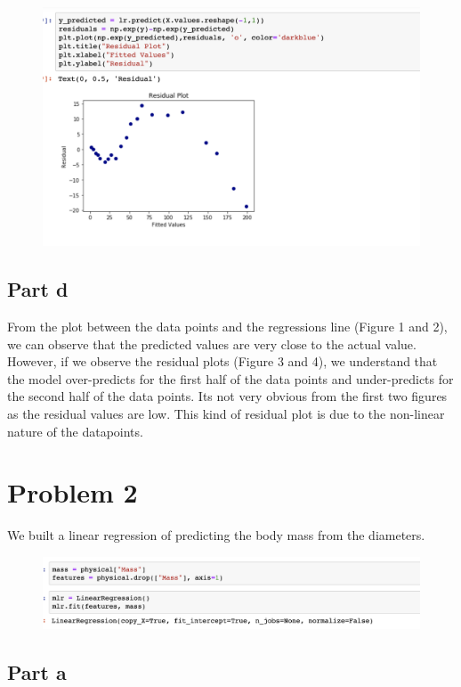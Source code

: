 \documentclass{article}      %
\begin{document}
\begin{figure}[H]
\centering
\includegraphics[width=\textwidth]{part5}
\end{figure}

\subsection{Part d} From the plot between the data points and the regressions line (Figure 1 and 2), we can observe that the predicted values are very close to the actual value. However, if we observe the residual plots (Figure 3 and 4), we understand that the model over-predicts for the first half of the data points and under-predicts for the second half of the data points. Its not very obvious from the first two figures as the residual values are low. This kind of residual plot is due to the non-linear nature of the datapoints.

\section{Problem 2} 

We built a linear regression of predicting the body mass from the diameters.

\begin{figure}[H]
\centering
\includegraphics[width=\textwidth]{part6}
\end{figure}

\subsection{Part a}
\end{document}
